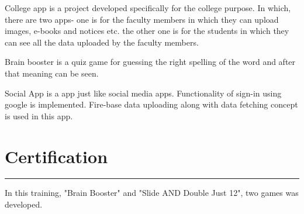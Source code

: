 \documentclass[]{sapna-resume}
\begin{document}
\begin{minipage}[t]{0.66\textwidth}
 
\noindent
\hspace{5em}%
\begin{minipage}{0.85\textwidth\vspace{2pt}}
College app is a project developed specifically for the college purpose. In which, there are two apps- one is for the faculty members in which they can upload images, e-books and notices etc. the other one is for the students in which they can see all the data uploaded by the faculty members.
\end{minipage}
\sectionsep

 
\noindent
\hspace{5em}%
\begin{minipage}{0.85\textwidth\vspace{2pt}}
Brain booster is a quiz game for guessing the right spelling of the word and after that meaning can be seen.
\end{minipage}
\sectionsep

 
\noindent
\hspace{5em}%
\begin{minipage}{0.85\textwidth\vspace{2pt}}
Social App is a app just like social media apps. Functionality of sign-in using google is implemented. Fire-base data uploading along with data fetching concept is used in this app.
\end{minipage}
\sectionsep

\section{Certification} 
\noindent\rule{12.5cm}{0.4pt}
 
\noindent
\hspace{5em}%
\begin{minipage}{0.85\textwidth\vspace{2pt}}
In this training, "Brain Booster" and "Slide AND Double Just 12", two games was developed.
\end{minipage}
\sectionsep


\end{minipage}
\end{document}
